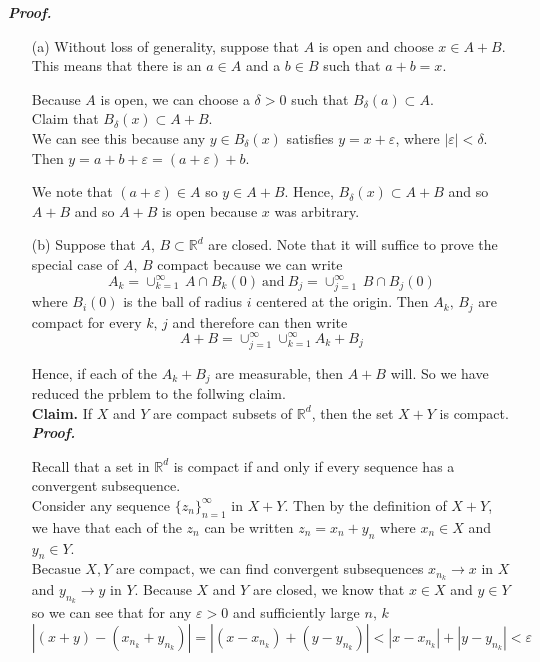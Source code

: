 \documentclass[a4paper,11pt]{article}
\begin{document}
\textbf{\textit{Proof.}}
\begin{enumerate}
	\item [(a)] Without loss of generality, suppose that $A$ is open and choose $x \in A + B$. This means that there is an $a \in A$ and a $b \in B$ such that $a + b = x$.

	Because $A$ is open, we can choose a $\delta > 0$ such that $B_\delta(a) \subset A$.\\

	Claim that $B_\delta(x) \subset A + B$.\\

	We can see this because any $y \in B_\delta(x)$ satisfies $y = x + \varepsilon$, where $|\varepsilon| < \delta$. Then $y = a + b + \varepsilon = (a + \varepsilon) + b$.

	We note that $(a + \varepsilon) \in A$ so $y \in A + B$. Hence, $B_\delta(x) \subset A + B$ and so $A + B$ and so $A + B$ is open because $x$ was arbitrary.\\

	\item [(b)] Suppose that $A,\, B \subset \mathbb{R}^d$ are closed. Note that it will suffice to prove the special case of $A,\, B$ compact because we can write
		$$A_k
		= \cup_{k=1}^\infty\, A \cap B_k(0)\
		\text{and}\
		B_j
		= \cup_{j=1}^\infty\, B \cap B_j(0)$$
	where $B_i(0)$ is the ball of radius $i$ centered at the origin. Then $A_k,\, B_j$ are compact for every $k,\, j$ and therefore can then write
		$$A + B = \cup_{j=1}^\infty \cup_{k=1}^\infty A_k + B_j$$

	Hence, if each of the $A_k + B_j$ are measurable, then $A + B$ will. So we have reduced the prblem to the follwing claim.\\

	\textbf{Claim.} If $X$ and $Y$ are compact subsets of $\mathbb{R}^d$, then the set $X + Y$ is compact.\\

	\textit{\textbf{Proof.}}

	Recall that a set in $\mathbb{R}^d$ is compact if and only if every sequence has a convergent subsequence.\\

	Consider any sequence $\{z_n\}_{n=1}^\infty$ in $X + Y$. Then by the definition of $X + Y$, we have that each of the $z_n$ can be written $z_n = x_n + y_n$ where $x_n \in X$ and $y_n \in Y$.\\

	Becasue $X, Y$ are compact, we can find convergent subsequences $x_{n_k} \to x$ in $X$ and $y_{n_k} \to y$ in $Y$. Because $X$ and $Y$ are closed, we know that $x \in X$ and $y \in Y$ so we can see that for any $\varepsilon > 0$ and sufficiently large $n,\,k$
		$$|(x + y) - (x_{n_k} + y_{n_k})|
		= |(x - x_{n_k}) + (y - y_{n_k})|
		< |x - x_{n_k}| + |y - y_{n_k}| < \varepsilon$$


\end{enumerate}
\end{document}

